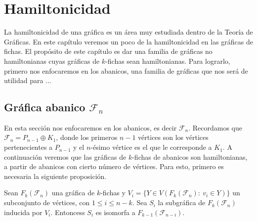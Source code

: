 \chapter{Hamiltonicidad}%
\label{cap:hamilt}

La hamiltonicidad de una gr\'afica es un \'area muy estudiada dentro de la
Teor\'ia de Gr\'aficas. En este cap\'itulo veremos un poco de la hamiltonicidad
en las gr\'aficas de fichas. El prop\'osito de este cap\'itulo es dar una
familia de gr\'aficas no hamiltonianas cuyas gr\'aficas de $k$-fichas sean
hamiltonianas. Para lograrlo, primero nos enfocaremos en los abanicos, una
familia de gr\'aficas que nos ser\'a de utilidad para ...


\section{Gr\'afica abanico $\mathcal{F}_n$}%
\label{sec:SimpleFan}

En esta secci\'on nos enfocaremos en los abanicos, es decir $\mathcal{F}_n$.
Recordamos que $\mathcal{F}_n = P_{n-1} \oplus K_1$, donde los primeros $n-1$
v\'ertices son los v\'ertices pertenecientes a $P_{n-1}$ y el $n$-\'esimo
v\'ertice es el que le corresponde a $K_1$. A continuaci\'on veremos que las
gr\'aficas de $k$-fichas de abanicos son hamiltonianas, a partir de abanicos con
cierto n\'umero de v\'ertices. Para esto, primero es necesaria la siguiente
proposici\'on.




\begin{proposicion}
        \label{prop:iso-SFan}
            Sean $F_k(\mathcal{F}_n)$ una gr\'afica de $k$-fichas y $V_i=\{ Y \in
            V(F_k(\mathcal{F}_n) \colon\ v_i \in Y) \}$ un subconjunto de v\'ertices, con
            $1 \leq i \leq n-k$. Sea $S_i$ la subgr\'afica de $F_k(\mathcal{F}_n)$
            inducida  por $V_i$. Entoncess $S_i$ es isomorfa a
            $F_{k-1}(\mathcal{F}_{n-i})$.
        \end{proposicion}
    
